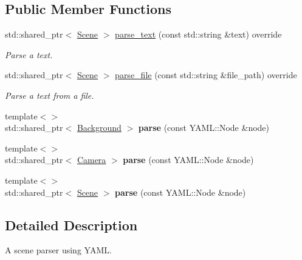 \subsection*{Public Member Functions}
\begin{DoxyCompactItemize}
\item 
std\+::shared\+\_\+ptr$<$ \mbox{\hyperlink{classomg_1_1_scene}{Scene}} $>$ \mbox{\hyperlink{classomg_1_1_y_a_m_l_parser_a646b059fb458cbd5b9bc3a29c1f777f4}{parse\+\_\+text}} (const std\+::string \&text) override
\begin{DoxyCompactList}\small\item\em Parse a text. \end{DoxyCompactList}\item 
std\+::shared\+\_\+ptr$<$ \mbox{\hyperlink{classomg_1_1_scene}{Scene}} $>$ \mbox{\hyperlink{classomg_1_1_y_a_m_l_parser_ab569d1029cec7dc2cb91eb0e08f5bc37}{parse\+\_\+file}} (const std\+::string \&file\+\_\+path) override
\begin{DoxyCompactList}\small\item\em Parse a text from a file. \end{DoxyCompactList}\item 
\mbox{\label{classomg_1_1_y_a_m_l_parser_ad0148bff25d36e0f0a46ab52647e5ef7}} 
{\footnotesize template$<$$>$ }\\std\+::shared\+\_\+ptr$<$ \mbox{\hyperlink{classomg_1_1_background}{Background}} $>$ {\bfseries parse} (const Y\+A\+M\+L\+::\+Node \&node)
\item 
\mbox{\label{classomg_1_1_y_a_m_l_parser_aae786077463e555fc165bf237cd71835}} 
{\footnotesize template$<$$>$ }\\std\+::shared\+\_\+ptr$<$ \mbox{\hyperlink{classomg_1_1_camera}{Camera}} $>$ {\bfseries parse} (const Y\+A\+M\+L\+::\+Node \&node)
\item 
\mbox{\label{classomg_1_1_y_a_m_l_parser_a164befb2f6725d60dd2d127651497ec9}} 
{\footnotesize template$<$$>$ }\\std\+::shared\+\_\+ptr$<$ \mbox{\hyperlink{classomg_1_1_scene}{Scene}} $>$ {\bfseries parse} (const Y\+A\+M\+L\+::\+Node \&node)
\end{DoxyCompactItemize}


\subsection{Detailed Description}
A scene parser using Y\+A\+ML. 

